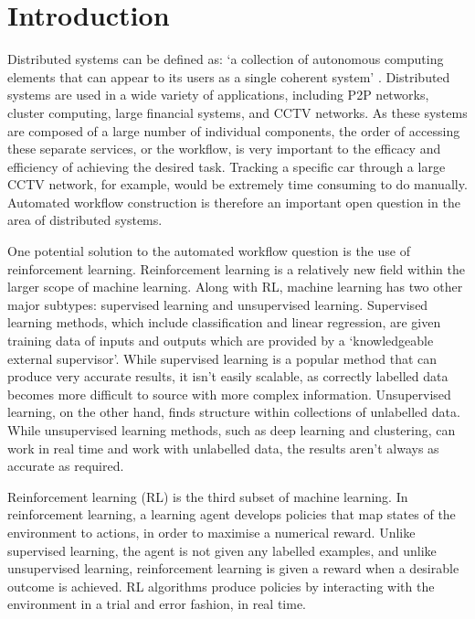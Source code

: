 \chapter{Introduction}

Distributed systems can be defined as: `a collection of autonomous computing elements that can appear to its users as a single coherent system' \cite{vanSteen2016}. Distributed systems are used in a wide variety of applications, including P2P networks, cluster computing, large financial systems, and CCTV networks. As these systems are composed of a large number of individual components, the order of accessing these separate services, or the workflow, is very important to the efficacy and efficiency of achieving the desired task. Tracking a specific car through a large CCTV network, for example, would be extremely time consuming to do manually. Automated workflow construction is therefore an important open question in the area of distributed systems. 

One potential solution to the automated workflow question is the use of reinforcement learning. Reinforcement learning is a relatively new field within the larger scope of machine learning. Along with RL, machine learning has two other major subtypes: supervised learning and unsupervised learning. Supervised learning methods, which include classification and linear regression, are given training data of inputs and outputs which are provided by a `knowledgeable external supervisor'. While supervised learning is a popular method that can produce very accurate results, it isn't easily scalable, as correctly labelled data becomes more difficult to source with more complex information. Unsupervised learning, on the other hand, finds structure within collections of unlabelled data. While unsupervised learning methods, such as deep learning and clustering, can work in real time and work with unlabelled data, the results aren't always as accurate as required.

Reinforcement learning (RL) is the third subset of machine learning. In reinforcement learning, a learning agent develops policies that map states of the environment to actions, in order to maximise a numerical reward. Unlike supervised learning, the agent is not given any labelled examples, and unlike unsupervised learning, reinforcement learning is given a reward when a desirable outcome is achieved. RL algorithms produce policies by interacting with the environment in a trial and error fashion, in real time. 

